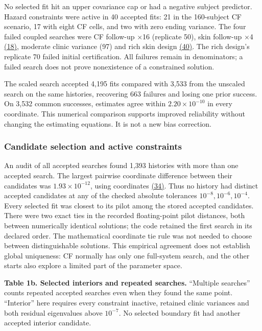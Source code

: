 \documentclass[11pt]{article}
\begin{document}
No selected fit hit an upper covariance cap or had a negative subject predictor. Hazard constraints were active in 40 accepted fits: 21 in the 160-subject CF scenario, 17 with eight CF cells, and two with zero ending variance. The four failed coupled searches were CF follow-up $\times$16 (replicate 50), skin follow-up $\times$4 \hyperref[eq:18]{(18)}, moderate clinic variance (97) and rich skin design \hyperref[eq:40]{(40)}. The rich design's replicate 70 failed initial certification. All failures remain in denominators; a failed search does not prove nonexistence of a constrained solution.

The scaled search accepted 4,195 fits compared with 3,533 from the unscaled search on the same histories, recovering 663 failures and losing one prior success. On 3,532 common successes, estimates agree within \(2.20\times10^{-10}\) in every coordinate. This numerical comparison supports improved reliability without changing the estimating equations. It is not a new bias correction.

\subsubsection{Candidate selection and active constraints}\label{sec:6.3.1}

An audit of all accepted searches found 1,393 histories with more than one accepted search. The largest pairwise coordinate difference between their candidates was \(1.93\times10^{-12}\), using coordinates \hyperref[eq:34]{(34)}. Thus no history had distinct accepted candidates at any of the checked absolute tolerances \(10^{-8},10^{-6},10^{-4}\). Every selected fit was closest to its pilot among the stored accepted candidates. There were two exact ties in the recorded floating-point pilot distances, both between numerically identical solutions; the code retained the first search in its declared order. The mathematical coordinate tie rule was not needed to choose between distinguishable solutions. This empirical agreement does not establish global uniqueness: CF normally has only one full-system search, and the other starts also explore a limited part of the parameter space.

\label{tab:1b}
\textbf{Table 1b. Selected interiors and repeated searches.} ``Multiple searches'' counts repeated accepted searches even when they found the same point. ``Interior'' here requires every constraint inactive, retained clinic variances and both residual eigenvalues above \(10^{-7}\). No selected boundary fit had another accepted interior candidate.
\end{document}
